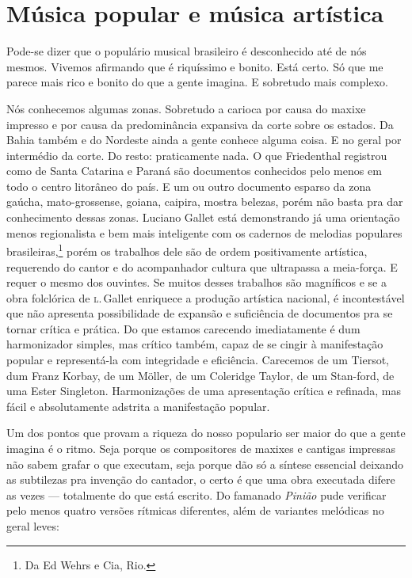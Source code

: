 \section{Música popular e música artística}

Pode-se dizer que o populário musical brasileiro é desconhecido até de
nós mesmos. Vivemos afirmando que é riquíssimo e bonito. Está certo. Só
que me parece mais rico e bonito do que a gente imagina. E sobretudo
mais complexo.

Nós conhecemos algumas zonas. Sobretudo a carioca por causa do maxixe
impresso e por causa da predominância expansiva da corte sobre os
estados. Da Bahia também e do Nordeste ainda a gente conhece alguma
coisa. E no geral por intermédio da corte. Do resto: praticamente nada.
O que Friedenthal registrou como de Santa Catarina e Paraná são
documentos conhecidos pelo menos em todo o centro litorâneo do país. E
um ou outro documento esparso da zona gaúcha, mato-grossense, goiana,
caipira, mostra belezas, porém não basta pra dar conhecimento dessas
zonas. Luciano Gallet está demonstrando já uma orientação menos
regionalista e bem mais inteligente com os cadernos de melodias populares brasileiras,\footnote{Da Ed Wehrs e Cia, Rio.} porém os trabalhos dele são
de ordem positivamente artística, requerendo do cantor e do acompanhador
cultura que ultrapassa a meia-força. E requer o mesmo dos ouvintes. Se
muitos desses trabalhos são magníficos e se a obra folclórica de \textsc{l}.\,Gallet enriquece a produção artística nacional, é incontestável que não
apresenta possibilidade de expansão e suficiência de documentos pra se
tornar crítica e prática. Do que estamos carecendo imediatamente é dum
harmonizador simples, mas crítico também, capaz de se cingir à
manifestação popular e representá-la com integridade e eficiência.
Carecemos de um Tiersot, dum Franz Korbay, de um Möller, de um Coleridge
Taylor, de um Stan-ford, de uma Ester Singleton. Harmonizações de uma
apresentação crítica e refinada, mas fácil e absolutamente adstrita a
manifestação popular.

Um dos pontos que provam a riqueza do nosso populario ser maior do que a
gente imagina é o ritmo. Seja porque os compositores de maxixes e
cantigas impressas não sabem grafar o que executam, seja porque dão só a
síntese essencial deixando as subtilezas pra invenção do cantador, o
certo é que uma obra executada difere as vezes --- totalmente do que
está escrito. Do famanado \textit{Pinião} pude verificar pelo menos quatro
versões rítmicas diferentes, além de variantes melódicas no geral leves:

